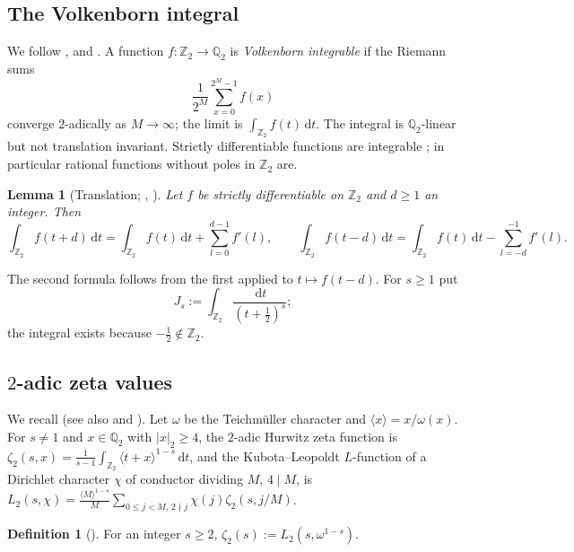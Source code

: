 \documentclass{amsart}
\newtheorem{lemma}[theorem]{Lemma}
\theoremstyle{definition}
\newtheorem{definition}[theorem]{Definition}
\theoremstyle{remark}
\numberwithin{equation}{section}
\newcommand{\Z}{\mathbb{Z}}
\newcommand{\Q}{\mathbb{Q}}
\newcommand{\dd}{\,\mathrm{d}}
\begin{document}
\subsection{The Volkenborn integral}\label{ss:volkenborn}

We follow \cite[Ch.~5]{Rob00}, \cite[\S2.2]{Lai25} and \cite[\S2.2]{LSZ26}.
A function $f\colon\Z_2\to\Q_2$ is \emph{Volkenborn integrable} \cite{Vol72} if
the Riemann sums
\begin{equation}\label{eq:riemann}
  \frac1{2^M}\sum_{x=0}^{2^M-1}f(x)
\end{equation}
converge $2$-adically as $M\to\infty$; the limit is
$\int_{\Z_2}f(t)\dd t$. The integral is $\Q_2$-linear but not translation
invariant. Strictly differentiable functions are integrable \cite[p.~264]{Rob00};
in particular rational functions without poles in $\Z_2$ are.

\begin{lemma}[Translation; {\cite[Lemma~2.2]{Lai25}, \cite[Lemma~2.4]{LSZ26}}]\label{lem:translation}
Let $f$ be strictly differentiable on $\Z_2$ and $d\ge1$ an integer. Then
\[
  \int_{\Z_2}f(t+d)\dd t=\int_{\Z_2}f(t)\dd t+\sum_{l=0}^{d-1}f'(l),
  \qquad
  \int_{\Z_2}f(t-d)\dd t=\int_{\Z_2}f(t)\dd t-\sum_{l=-d}^{-1}f'(l).
\]
\end{lemma}

The second formula follows from the first applied to $t\mapsto f(t-d)$. For
$s\ge1$ put
\begin{equation}\label{eq:Js}
  J_s:=\int_{\Z_2}\frac{\dd t}{(t+\frac12)^s};
\end{equation}
the integral exists because $-\frac12\notin\Z_2$.

\subsection{\texorpdfstring{$2$}{2}-adic zeta values}\label{ss:zeta2}

We recall \cite[\S2.3]{LSZ26} (see also \cite[\S2.3]{Lai25} and
\cite[Ch.~11]{Coh07}). Let $\omega$ be the Teichm\"uller character and
$\langle x\rangle=x/\omega(x)$. For $s\ne1$ and $x\in\Q_2$ with $|x|_2\ge4$, the
$2$-adic Hurwitz zeta function is
$\zeta_2(s,x)=\frac1{s-1}\int_{\Z_2}\langle t+x\rangle^{1-s}\dd t$, and the
Kubota--Leopoldt $L$-function of a Dirichlet character $\chi$ of conductor
dividing $M$, $4\mid M$, is
$L_2(s,\chi)=\frac{\langle M\rangle^{1-s}}{M}\sum_{0\le j<M,\,2\nmid j}\chi(j)\zeta_2(s,j/M)$.

\begin{definition}[{\cite[Definition~2.7]{LSZ26}}]\label{def:zeta2}
For an integer $s\ge2$, $\zeta_2(s):=L_2(s,\omega^{1-s})$.
\end{definition}
\end{document}
